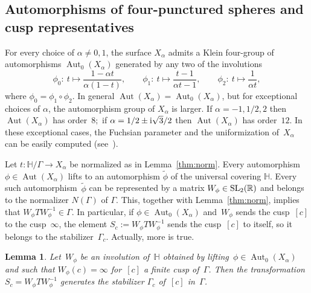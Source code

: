 \documentclass[pdftex]{sigma}
\newcommand{\R}{\mathbb{R}}
\newcommand{\Po}{\mathbb{H}}
\numberwithin{equation}{section}
\newtheorem{Lemma}[Theorem]{Lemma}
\begin{document}
\subsection{Automorphisms of four-punctured spheres and cusp representatives}\label{sec:cusprep}

For every choice of $\alpha\neq 0,1$, the surface $X_\alpha$ admits a Klein four-group of automorphisms $\operatorname{Aut}_0(X_\alpha)$ generated by any two of the involutions
\begin{equation}\label{eqn:autom}
\phi_0\colon\ t\mapsto\frac{1-\alpha t}{\alpha(1-t)},\qquad\phi_1\colon\ t\mapsto\frac{t-1}{\alpha{t}-1},\qquad \phi_2\colon\ t\mapsto\frac{1}{\alpha t},
\end{equation}
where $\phi_0=\phi_1\circ\phi_2$. In general $\operatorname{Aut}(X_\alpha)=\operatorname{Aut}_0(X_\alpha)$, but for exceptional choices of $\alpha$, the automorphism group of $X_\alpha$ is larger. If $\alpha=-1,1/2,2$ then $\operatorname{Aut}(X_\alpha)$ has order~$8;$ if $\alpha=1/2\pm {\rm i}\sqrt{3}/2$ then $\operatorname{Aut}(X_\alpha)$ has order~$12$. In these exceptional cases, the Fuchsian parameter and the uniformization of~$X_\alpha$ can be easily computed (see~\cite{Hempel}).

Let $t\colon\Po/\Gamma\to X_{\alpha}$ be normalized as in Lemma~\ref{thm:norm}. Every automorphism $\phi\in\operatorname{Aut}(X_\alpha)$ lifts to an automorphism $\tilde{\phi}$ of the universal covering $\Po$.
Every such automorphism~$\tilde{\phi}$ can be represented by a matrix $W_\phi\in{\rm SL}_2(\R)$ and belongs to the normalizer $N(\Gamma)$ of $\Gamma$. This, together with Lemma~\ref{thm:norm}, implies that $W_\phi TW_\phi^{-1}\in\Gamma$.
In particular, if $\phi\in\operatorname{Aut}_0(X_\alpha)$ and~$W_\phi$ sends the cusp~$[c]$ to the cusp~$\infty$, the element $S_c:=W_\phi TW_\phi^{-1}$ sends the cusp~$[c]$ to itself, so it belongs to the stabilizer~$\Gamma_c$. Actually, more is true.
\begin{Lemma}\label{thm:stab}
Let~$W_\phi$ be an involution of~$\Po$ obtained by lifting~$\phi\in\operatorname{Aut}_0(X_\alpha)$ and such that $W_\phi(c)=\infty$ for~$[c]$ a finite cusp of~$\Gamma$.
Then the transformation $S_c=W_\phi TW_\phi^{-1}$ generates the stabilizer $\Gamma_c$ of~$[c]$ in~$\Gamma$.
\end{Lemma}
\end{document}
